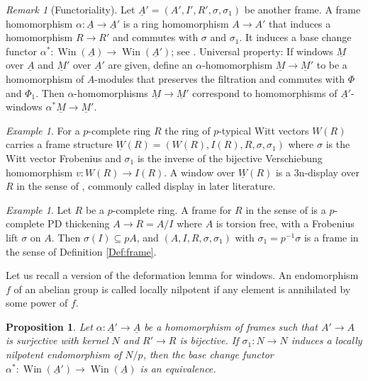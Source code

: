 \documentclass[a4paper,11pt]{article}
\theoremstyle{plain}
\newtheorem{Prop}[Lemma]{Proposition}
\theoremstyle{definition}
\theoremstyle{remark}
\newtheorem{Remark}[Lemma]{Remark}
\newtheorem{Example}[Lemma]{Example}
\theoremstyle{definition}
\numberwithin{Lemma}{section}
\numberwithin{Subpoint}{Lemma}
\numberwithin{equation}{section}
\DeclareMathOperator{\Win}{Win}
\renewcommand{\u}{\underline}
\newcommand{\chang}[1]{{#1}}
\begin{document}
\begin{Remark}[Functoriality]
\label{Rk:frame-funct}
Let $\u A'=(A',I',R',\sigma,\sigma_1)$ be another frame.
A frame homomorphism $\alpha:\u A\to\u A'$ is a ring homomorphism
$A\to A'$ that induces a homomorphism $R\to R'$ and commutes with $\sigma$ and $\sigma_1$.
It induces a base change functor $\alpha^*:\Win(\u A)\to\Win(\u A')$;
see \cite[Lemma 2.10]{Lau:Frames}.
Universal property:
If windows $\u M$ over $\u A$ and $\u M'$ over $\u A'$ are given,
define an $\alpha$-homomorphism $\u M\to\u M'$ to be a homomorphism of $A$-modules
that preserves the filtration and commutes with $\Phi$ and $\Phi_1$.
Then $\alpha$-homomorphisms $\u M\to\u M'$ correspond to
homomorphisms of $\u A'$-windows $\alpha^*\u M\to\u M'$. 
\end{Remark}

\begin{Example}
\label{Ex:frame-W}
For a \chang{$p$-complete} ring $R$ the ring of $p$-typical Witt vectors
$W(R)$ carries a frame structure $\u W(R)=(W(R),I(R),R,\sigma,\sigma_1)$
where $\sigma$ is the Witt vector Frobenius and $\sigma_1$ is the inverse
of the bijective Verschiebung homomorphism $v:W(R)\to I(R)$.
A window over $\u W(R)$ is a 3n-display over $R$ 
in the sense of \cite{Zink:Display}, 
\chang{commonly called display in later literature.}
\end{Example}

\begin{Example}
\label{Ex:Witt-frame}
Let $R$ be a \chang{$p$-complete} ring.
A frame for $R$ in the sense of \cite{Zink:Windows} is a 
\chang{$p$-complete} PD thickening $A\to R=A/I$ where $A$ is torsion free,
with a Frobenius lift $\sigma$ on $A$.
Then $\sigma(I)\subseteq pA$, and $(A,I,R,\sigma,\sigma_1)$
with $\sigma_1=p^{-1}\sigma$ is a frame in the sense of
Definition \ref{Def:frame}.
\end{Example}

Let us recall a version of the deformation lemma for windows.
An endomorphism $f$ of an abelian group is called \chang{locally}
nilpotent if \chang{any} element is annihilated by some power of $f$.

\begin{Prop}
\label{Pr:deform-win}
Let $\alpha:\u A'\to\u A$ be a homomorphism of frames 
such that $A'\to A$ is surjective with kernel $N$
and $R'\to R$ is bijective.
If $\sigma_1:N\to N$ induces a \chang{locally} nilpotent endomorphism of $N/p$, 
then the base change functor $\alpha^*:\Win(\u A')\to\Win(\u A)$
is an equivalence.
\end{Prop}
\end{document}
